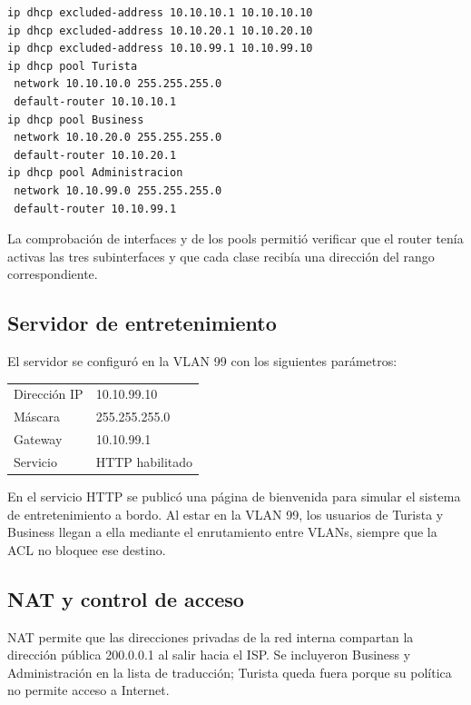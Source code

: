 \documentclass[12pt,a4paper]{article}
\begin{document}
\begin{verbatim}
ip dhcp excluded-address 10.10.10.1 10.10.10.10
ip dhcp excluded-address 10.10.20.1 10.10.20.10
ip dhcp excluded-address 10.10.99.1 10.10.99.10
ip dhcp pool Turista
 network 10.10.10.0 255.255.255.0
 default-router 10.10.10.1
ip dhcp pool Business
 network 10.10.20.0 255.255.255.0
 default-router 10.10.20.1
ip dhcp pool Administracion
 network 10.10.99.0 255.255.255.0
 default-router 10.10.99.1
\end{verbatim}

La comprobación de interfaces y de los pools permitió verificar que el router tenía activas las tres subinterfaces y que cada clase recibía una dirección del rango correspondiente.

\subsection{Servidor de entretenimiento}
El servidor se configuró en la VLAN 99 con los siguientes parámetros:

\begin{center}
\small
\begin{tabular}{@{}ll@{}}
\toprule
Dirección IP & 10.10.99.10 \\
Máscara & 255.255.255.0 \\
Gateway & 10.10.99.1 \\
Servicio & HTTP habilitado \\
\bottomrule
\end{tabular}
\end{center}

En el servicio HTTP se publicó una página de bienvenida para simular el sistema de entretenimiento a bordo. Al estar en la VLAN 99, los usuarios de Turista y Business llegan a ella mediante el enrutamiento entre VLANs, siempre que la ACL no bloquee ese destino.

\subsection{NAT y control de acceso}
NAT permite que las direcciones privadas de la red interna compartan la dirección pública 200.0.0.1 al salir hacia el ISP. Se incluyeron Business y Administración en la lista de traducción; Turista queda fuera porque su política no permite acceso a Internet.
\end{document}
